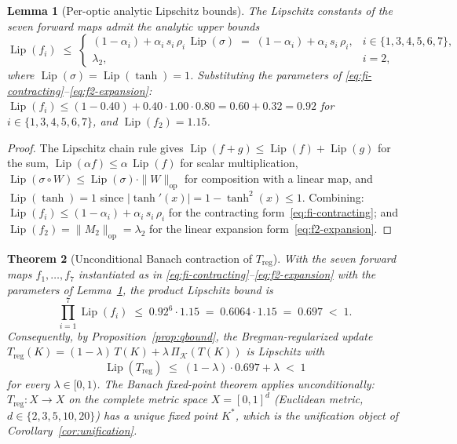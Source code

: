 \documentclass[11pt,a4paper]{article}
\theoremstyle{plain}
\newtheorem{theorem}{Theorem}[section]
\newtheorem{lemma}[theorem]{Lemma}
\theoremstyle{definition}
\theoremstyle{remark}
\DeclareMathOperator{\Lip}{Lip}
\begin{document}
\begin{lemma}[Per-optic analytic Lipschitz bounds]
\label{lem:lip-per-optic}
The Lipschitz constants of the seven forward maps admit the analytic
upper bounds
\begin{equation}\label{eq:lip-per-optic}
  \Lip(f_{i}) \;\leq\;
  \begin{cases}
  (1-\alpha_{i})+\alpha_{i}\,s_{i}\,\rho_{i}\,\Lip(\sigma)
   \;=\; (1-\alpha_{i})+\alpha_{i}\,s_{i}\,\rho_{i},
   & i\in\{1,3,4,5,6,7\},\\[4pt]
  \lambda_{2}, & i=2,
  \end{cases}
\end{equation}
where $\Lip(\sigma)=\Lip(\tanh)=1$. Substituting the parameters of
\eqref{eq:fi-contracting}--\eqref{eq:f2-expansion}:
$\Lip(f_{i})\leq (1-0.40)+0.40\cdot 1.00\cdot 0.80 = 0.60+0.32=0.92$
for $i\in\{1,3,4,5,6,7\}$, and $\Lip(f_{2})=1.15$.
\end{lemma}

\begin{proof}
The Lipschitz chain rule gives $\Lip(f+g)\leq \Lip(f)+\Lip(g)$ for the
sum, $\Lip(\alpha f)\leq \alpha\,\Lip(f)$ for scalar multiplication,
$\Lip(\sigma\circ W)\leq \Lip(\sigma)\cdot\|W\|_{\mathrm{op}}$ for
composition with a linear map, and $\Lip(\tanh)=1$ since
$|\tanh'(x)|=1-\tanh^{2}(x)\leq 1$. Combining:
$\Lip(f_{i})\leq (1-\alpha_{i})+\alpha_{i}\,s_{i}\,\rho_{i}$ for the
contracting form~\eqref{eq:fi-contracting}; and $\Lip(f_{2})=
\|M_{2}\|_{\mathrm{op}}=\lambda_{2}$ for the linear expansion
form~\eqref{eq:f2-expansion}.
\end{proof}

\begin{theorem}[Unconditional Banach contraction of $T_{\mathrm{reg}}$]
\label{thm:unconditional-banach}
With the seven forward maps $f_{1},\ldots,f_{7}$ instantiated as in
\eqref{eq:fi-contracting}--\eqref{eq:f2-expansion} with the parameters
of Lemma~\ref{lem:lip-per-optic}, the product Lipschitz bound is
\begin{equation}\label{eq:product-lip}
  \prod_{i=1}^{7}\Lip(f_{i}) \;\leq\; 0.92^{6}\cdot 1.15
  \;=\; 0.6064\cdot 1.15 \;=\; 0.697 \;<\; 1.
\end{equation}
Consequently, by Proposition~\ref{prop:qbound}, the Bregman-regularized
update
$T_{\mathrm{reg}}(K)=(1-\lambda)\,T(K)+\lambda\,\Pi_{\mathcal K}(T(K))$
is Lipschitz with
\begin{equation}\label{eq:treg-uncond}
  \Lip(T_{\mathrm{reg}}) \;\leq\; (1-\lambda)\cdot 0.697+\lambda
  \;<\; 1
\end{equation}
for every $\lambda\in[0,1)$. The Banach fixed-point theorem applies
unconditionally: $T_{\mathrm{reg}}:X\to X$ on the complete metric space
$X=[0,1]^{d}$ (Euclidean metric, $d\in\{2,3,5,10,20\}$) has a unique
fixed point $K^{*}$, which is the unification object of
Corollary~\ref{cor:unification}.
\end{theorem}
\end{document}
